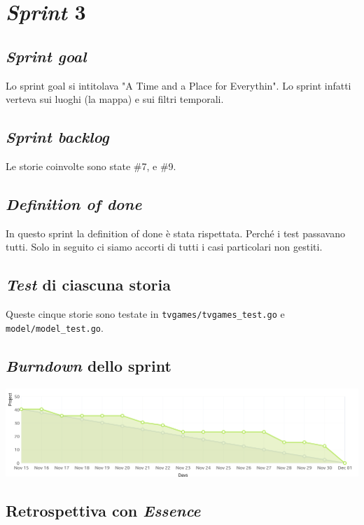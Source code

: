 \documentclass{article}
\begin{document}
\section{\emph{Sprint} 3}

\subsection{\emph{Sprint goal}}

Lo sprint goal si intitolava "A Time and a Place for Everythin". Lo sprint
infatti verteva sui luoghi (la mappa) e sui filtri temporali.

\subsection{\emph{Sprint backlog}}

Le storie coinvolte sono state \#7, \8 e \#9.

\subsection{\emph{Definition of done}}

In questo sprint la definition of done è stata rispettata. Perché i test
passavano tutti. Solo in seguito ci siamo accorti di tutti i casi particolari
non gestiti.

\subsection{\emph{Test} di ciascuna storia}

Queste cinque storie sono testate in \verb!tvgames/tvgames_test.go! e
\verb!model/model_test.go!.

\subsection{\emph{Burndown} dello sprint}

\includegraphics[width=\textwidth]{burndown-3}

\subsection{Retrospettiva con \emph{Essence}}
\end{document}

